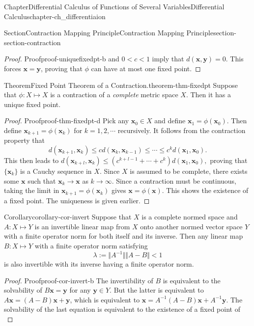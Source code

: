 \documentclass[oneside,10pt,]{book}
\numberwithin{equation}{section}
\newcommand{\bx}{\mathbf{x}}
\newcommand{\by}{\mathbf{y}}
\newcommand{\lt}{<}
\begin{document}
\begin{chapterptx}{Chapter}{Differential Calculus of Functions of Several Variables}{}{Differential Calculus}{}{}{chapter-ch_differentiaion}
\begin{sectionptx}{Section}{Contraction Mapping Principle}{}{Contraction Mapping Principle}{}{}{section-section-contraction}
\begin{proof}{Proof}{}{proof-uniquefixedpt-b}
and  \(0\lt c \lt 1\) imply that \(d(\bx, \by)=0\). This forces \(\bx=\by\), proving that \(\phi\) can have at most one fixed point.\end{proof}
\begin{theorem}{Theorem}{Fixed Point Theorem of a Contraction.}{}{theorem-thm-fixedpt}%
%
Suppose that \(\phi:X\mapsto X\) is a contraction of a \emph{complete} metric space \(X\). Then it has a unique fixed point.%
\end{theorem}
\begin{proof}{Proof}{}{proof-thm-fixedpt-d}
Pick any \(\bx_{0}\in X\) and define \(\bx_{1}=\phi(\bx_{0})\). Then define \(\bx_{k+1}=\phi(\bx_{k})\) for \(k=1, 2, \cdots\) recursively. It follows from the contraction property that%
\begin{equation*}
d(\bx_{k+1}, \bx_{k})\le c d(\bx_{k},\bx_{k-1})\le\cdots \le  c^{k}d(\bx_{1}, \bx_{0}).
\end{equation*}
This then leads to \(d(\bx_{k+l}, \bx_{k})\le \left(c^{k+l-1}+\cdots+c^{k}\right) d(\bx_{1}, \bx_{0}),\) proving that \(\{\bx_{k}\}\) is a Cauchy sequence in \(X\). Since \(X\) is assumed to be complete, there exists some \(\bx\) such that \(\bx_{k}\to \bx\) as \(k\to \infty\). Since a contraction must be continuous, taking the limit in \(\bx_{k+1}=\phi(\bx_{k})\) gives \(\bx=\phi(\bx)\). This shows the existence of a fixed point. The uniqueness is given earlier.%
\end{proof}
\begin{corollary}{Corollary}{}{}{corollary-cor-invert}%
Suppose that \(X\) is a complete normed space and \(A:X\mapsto Y\) is an invertible linear map from \(X\) onto another normed vector space \(Y\) with a finite operator norm for both itself and its inverse. Then any linear map \(B:X \mapsto Y\) with a finite operator norm satisfying%
\begin{equation*}
\lambda :=\Vert A^{-1}\Vert \Vert A-B\Vert \lt 1
\end{equation*}
is also invertible with its inverse having a finite operator norm.%
\end{corollary}
\begin{proof}{Proof}{}{proof-cor-invert-b}
The invertibility of \(B\) is equivalent to the solvability of \(B\bx =\by\) for any \(\by \in Y\). But the latter is equivalent to \(A\bx =(A-B)\bx +\by\), which is equivalent to \(\bx= A^{-1}(A-B)\bx + A^{-1}\by\). The solvability of the last equation is equivalent to the existence of a fixed point of%
\begin{equation*}

\end{equation*}
\end{proof}
\end{sectionptx}
\end{chapterptx}
\end{document}
